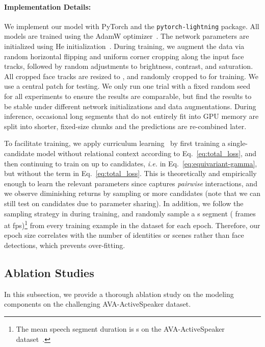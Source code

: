 \documentclass[sigconf]{acmart}
\begin{document}
\begin{CCSXML}
\paragraph{Implementation Details:} We implement our model with PyTorch and the \texttt{pytorch-lightning} package. All models are trained using the AdamW optimizer~\cite{DBLP:conf/iclr/LoshchilovH19}. The network parameters are initialized using He initialization~\cite{DBLP:conf/iccv/HeZRS15}. During training, we augment the data via random horizontal flipping and uniform corner cropping along the input face tracks, followed by random adjustments to brightness, contrast, and saturation. All cropped face tracks are resized to , and randomly cropped to  for training. We use a central  patch for testing. We only run one trial with a fixed random seed for all experiments to ensure the results are comparable, but find the results to be stable under different network initializations and data augmentations. During inference, occasional long segments that do not entirely fit into GPU memory are split into shorter, fixed-size chunks and the predictions are re-combined later.

To facilitate training, we apply curriculum learning~\cite{DBLP:conf/icml/BengioLCW09} by first training a single-candidate model without relational context according to Eq.~\eqref{eq:total_loss}, and then continuing to train on up to  candidates, \textit{i.e.}  in Eq.~\eqref{eq:equivariant-gamma}, but without the  term in Eq.~\eqref{eq:total_loss}. This is theoretically and empirically enough to learn the relevant parameters since  captures \textit{pairwise} interactions, and we observe diminishing returns by sampling  or more candidates (note that we can still test on  candidates due to parameter sharing). In addition, we follow the sampling strategy in \cite{DBLP:conf/cvpr/AlcazarCMPLAG20} during training, and randomly sample a s segment ( frames at fps)\footnote{The mean speech segment duration is s on the AVA-ActiveSpeaker dataset~\cite{DBLP:conf/icassp/RothCKMGKRSSXP20}.} from every training example in the dataset for each epoch. Therefore, our epoch size correlates with the number of identities or scenes rather than face detections, which prevents over-fitting.
\vspace{-2ex}
\subsection{Ablation Studies}\label{sec:ablations}
In this subsection, we provide a thorough ablation study on the modeling components on the challenging AVA-ActiveSpeaker dataset.
\vspace{-4ex}

\end{CCSXML}
\end{document}
